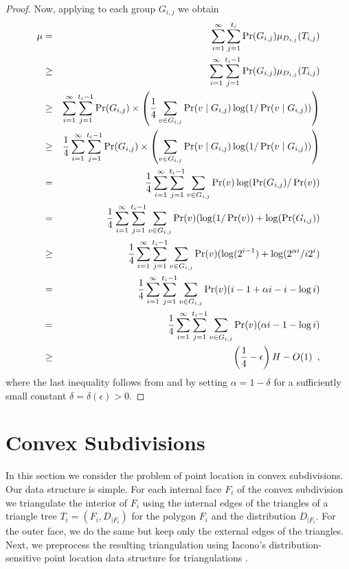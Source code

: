 \documentclass[charterfonts,lotsofwhite]{patmorin}
\begin{document}
\begin{proof}
Now, applying  to each group $G_{i,j}$ 
we obtain
\begin{eqnarray*}
\mu & = & \sum_{i=1}^{\infty}\sum_{j=1}^{t_i}
	\Pr(G_{i,j})\mu_{D_{i,j}}(T_{i,j}) \\
& \ge & \sum_{i=1}^{\infty}\sum_{j=1}^{t_i-1}
	\Pr(G_{i,j})\mu_{D_{i,j}}(T_{i,j}) \\
& \ge & \sum_{i=1}^{\infty}\sum_{j=1}^{t_i-1}\Pr(G_{i,j})\times
	\left(\frac{1}{4}
	\sum_{v\in G_{i,j}}\Pr(v\mid G_{i,j})\log(1/\Pr(v\mid G_{i,j}))
	\right) \\
& \ge & \frac{1}{4}\sum_{i=1}^{\infty}\sum_{j=1}^{t_i-1}\Pr(G_{i,j})\times
	\left(
	\sum_{v\in G_{i,j}}\Pr(v\mid G_{i,j})\log(1/\Pr(v\mid G_{i,j}))
	\right) \\
& = & \frac{1}{4}\sum_{i=1}^{\infty}\sum_{j=1}^{t_i-1}
	\sum_{v\in G_{i,j}}\Pr(v)\log(\Pr(G_{i,j})/\Pr(v)) \\
& = & \frac{1}{4}\sum_{i=1}^{\infty}\sum_{j=1}^{t_i-1}
	\sum_{v\in G_{i,j}}\Pr(v)(\log(1/\Pr(v))+ \log(\Pr(G_{i,j})) \\
& \ge & \frac{1}{4}\sum_{i=1}^{\infty}\sum_{j=1}^{t_i-1}
	\sum_{v\in G_{i,j}}\Pr(v)(\log(2^{i-1}) + \log(2^{\alpha i}/i2^{i}) \\
& = & \frac{1}{4}\sum_{i=1}^{\infty}\sum_{j=1}^{t_i-1}
	\sum_{v\in G_{i,j}}\Pr(v)(i-1 + \alpha i -i -\log i) \\
& = & \frac{1}{4}\sum_{i=1}^{\infty}\sum_{j=1}^{t_i-1}
	\sum_{v\in G_{i,j}}\Pr(v)(\alpha i  -1 -\log i) \\
\comment{
& \ge & \frac{1}{4}\sum_{i=1}^{\infty}\sum_{j=1}^{t_i-1}
	\sum_{v\in G_{i,j}}\Pr(v)(i/4 - 3) \\
& \ge & \left(\frac{1}{24}\sum_{i=1}^{\infty}\sum_{j=1}^{t_i-1}
	\sum_{v\in G_{i,j}}\Pr(v)\log (1/\Pr(v))\right)-4 \\
}
& \ge & \left(\frac{1}{4}-\epsilon\right)H - O(1)  \enspace ,
\end{eqnarray*}
where the last inequality follows from  and by setting
$\alpha = 1-\delta$ for a sufficiently small constant
$\delta=\delta(\epsilon) > 0$.
\end{proof}

\section{Convex Subdivisions}

In this section we consider the problem of point location in convex
subdivisions. Our data structure is simple.  For each internal face
$F_i$ of the convex subdivision we triangulate the interior of $F_i$
using the internal edges of the triangles of a triangle tree
$T_i=(F_i,D_{|F_i})$ for the polygon $F_i$ and the distribution
$D_{|F_i}$. For the outer face, we do the same but keep only the
external edges of the triangles.  Next, we preprocess the resulting
triangulation using Iacono's distribution-sensitive point location
data structure for triangulations \cite{i01}.
\end{document}
